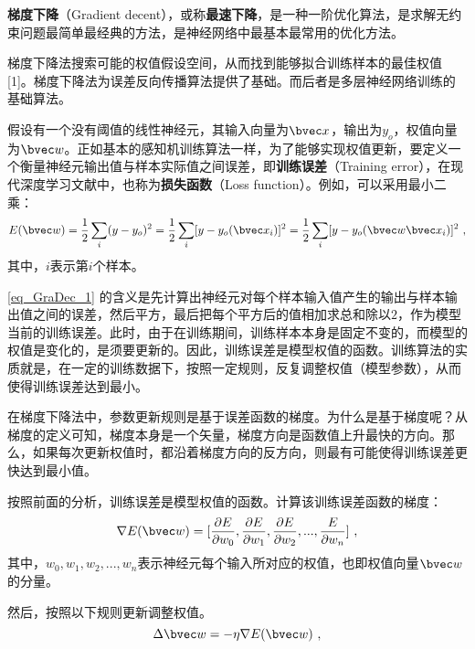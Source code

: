 

\textbf{梯度下降}（Gradient decent），或称\textbf{最速下降}，是一种一阶优化算法，是求解无约束问题最简单最经典的方法，是神经网络中最基本最常用的优化方法。

梯度下降法搜索可能的权值假设空间，从而找到能够拟合训练样本的最佳权值 [1]。梯度下降法为误差反向传播算法提供了基础。而后者是多层神经网络训练的基础算法。

假设有一个没有阈值的线性神经元，其输入向量为$\bvec x$，输出为$y_o$，权值向量为$\bvec w$。正如基本的感知机训练算法一样，为了能够实现权值更新，要定义一个衡量神经元输出值与样本实际值之间误差，即\textbf{训练误差}（Training error），在现代深度学习文献中，也称为\textbf{损失函数}（Loss function）。例如，可以采用最小二乘：
\begin{equation}\label{eq_GraDec_1}
E(\bvec w)=\frac{1}{2}\sum_i(y-y_o)^2=\frac{1}{2}\sum_i[y-y_o(\bvec x_i)]^2=\frac{1}{2}\sum_i[y-y_o(\bvec w \bvec x_i)]^2~,
\end{equation}
其中，$i$表示第$i$个样本。

\autoref{eq_GraDec_1} 的含义是先计算出神经元对每个样本输入值产生的输出与样本输出值之间的误差，然后平方，最后把每个平方后的值相加求总和除以$2$，作为模型当前的训练误差。此时，由于在训练期间，训练样本本身是固定不变的，而模型的权值是变化的，是须要更新的。因此，训练误差是模型权值的函数。训练算法的实质就是，在一定的训练数据下，按照一定规则，反复调整权值（模型参数），从而使得训练误差达到最小。

在梯度下降法中，参数更新规则是基于误差函数的梯度。为什么是基于梯度呢？从梯度的定义可知，梯度本身是一个矢量，梯度方向是函数值上升最快的方向。那么，如果每次更新权值时，都沿着梯度方向的反方向，则最有可能使得训练误差更快达到最小值。

按照前面的分析，训练误差是模型权值的函数。计算该训练误差函数的梯度：
\begin{equation}
\nabla E(\bvec w)=[\frac{\partial E}{\partial w_0},\frac{ \partial E}{\partial w_1},\frac{\partial E}{\partial w_2},...,\frac{E}{\partial w_n}]~,
\end{equation}
其中，$w_0,w_1,w_2, ..., w_n$表示神经元每个输入所对应的权值，也即权值向量$\bvec w$的分量。

然后，按照以下规则更新调整权值。
\begin{equation}\label{eq_GraDec_2}
\Delta \bvec w = - \eta \nabla E(\bvec w)~,
\end{equation}

